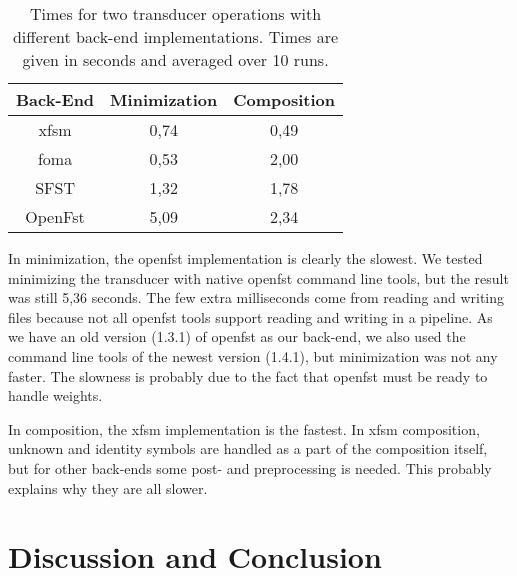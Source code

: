 \documentclass{llncs}
\begin{document}
\begin{table}[h!]
  \centering
  \caption{Times for two transducer operations with different back-end implementations.
    Times are given in seconds and averaged over 10 runs.}
  \begin{tabular}{c c c }
    \hline
    Back-End & Minimization & Composition \\ \hline
    xfsm & 0,74 & 0,49 \\
    foma & 0,53 & 2,00 \\
    SFST & 1,32 & 1,78 \\
    OpenFst & 5,09 & 2,34 \\ \hline
  \end{tabular}
  \label{operationtimes}
\end{table}

In minimization, the openfst implementation is clearly the slowest. We tested minimizing
the transducer with native openfst command line tools, but the result was still 5,36 seconds.
The few extra milliseconds come from reading and writing files because not all openfst tools support reading
and writing in a pipeline. As we have an old version (1.3.1) of openfst as our back-end, we also
used the command line tools of the newest version (1.4.1), but minimization was not any faster.
The slowness is probably due to the fact that openfst must be ready to handle weights.

In composition, the xfsm implementation is the fastest. In xfsm composition, unknown and identity
symbols are handled as a part of the composition itself, but for other back-ends some post- and preprocessing is
needed. This probably explains why they are all slower.

\section{Discussion and Conclusion}\label{sec:discussion}
\end{document}

